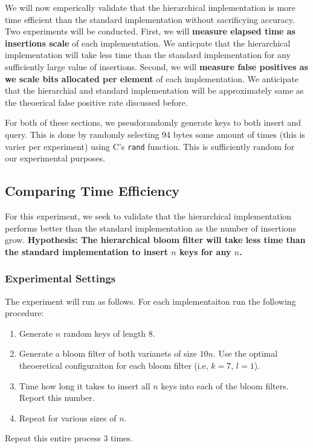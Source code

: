We will now emperically validate that the hierarchical implementation is more time efficient than the standard implementation without sacrificying accuracy.
Two experiments will be conducted.
First, we will \textbf{measure elapsed time as insertions scale} of each implementation.
We anticpate that the hierarchical implementation will take less time than the standard implementation for any sufficiently large value of insertions.
Second, we will \textbf{measure false positives as we scale bits allocated per element} of each implementation.
We anticipate that the hierarchial and standard implementation will be approximately same as the theoerical false positive rate discussed before.

For both of these sections, we pseudorandomly generate keys to both insert and query.
This is done by randomly selecting 94 bytes some amount of times (this is varier per experiment) using C's \texttt{rand} function.
This is sufficiently random for our experimental purposes. 

\subsection{Comparing Time Efficiency}

For this experiment, we seek to validate that the hierarchical implementation performs better than the standard implementation as the number of insertions grow.
\textbf{Hypothesis: The hierarchical bloom filter will take less time than the standard implementation to insert $n$ keys for any $n$.}

\subsubsection{Experimental Settings}

The experiment will run as follows. For each implementaiton run the following procedure:
\begin{enumerate}
    \item Generate $n$ random keys of length $8$.
    \item Generate a bloom filter of both varianets of size $10n$. Use the optimal theoeretical configuraiton for each bloom filter (i.e, $k=7$, $l=1$).
    \item Time how long it takes to insert all $n$ keys into each of the bloom filters. Report this number.
    \item Repeat for various sizes of $n$.
\end{enumerate}
Repeat this entire process $3$ times.

